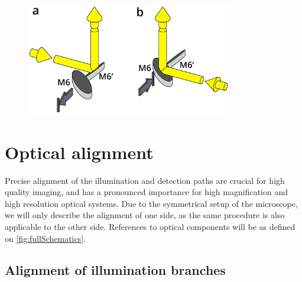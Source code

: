       \label{sec:dualMirror}
      \begin{figure}[tb]
        \centering
        \includegraphics[width=0.8\textwidth]{SW/dualMirrorFigure}
        \label{fig:dualMirror}
      \end{figure}
        
      


\section{Optical alignment}
  Precise alignment of the illumination and detection paths are crucial for high quality imaging, and has a pronounced importance for high magnification and high resolution optical systems. 
  Due to the symmetrical setup of the microscope, we will only describe the alignment of one side, as the same procedure is also applicable to the other side. References to optical components will be as defined on \autoref{fig:fullSchematics}.

  \subsection{Alignment of illumination branches}

